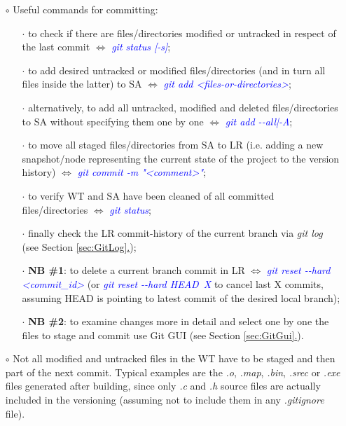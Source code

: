 \documentclass[a4paper,portrait,10pt]{article}   %
\newcommand{\mydiv}{$\Leftrightarrow$ }   %
\newcommand{\mycmd}[1]{\textcolor{blue}{\textit{#1}}}   %
\newcommand{\myvspace}{\vspace{4mm}}   %
\newcommand{\mysecref}[1]{\hyperref[#1]{\ref{#1}.}}   %
\begin{document}
\begin{itemize}
\item[$\circ$] Useful commands for committing:
\begin{itemize}
  \item[$\cdot$] to check if there are files/directories modified or untracked in respect of the last commit \mydiv \mycmd{git status [-s]};
  \item[$\cdot$] to add desired untracked or modified files/directories (and in turn all files inside the latter) to SA \mydiv \mycmd{git add <files-or-directories>};
  \item[$\cdot$] alternatively, to add all untracked, modified and deleted files/directories to SA without specifying them one by one \mydiv \mycmd{git add -{}-all|-A};
  \item[$\cdot$] to move all staged files/directories from SA to LR (i.e. adding a new snapshot/node representing the current state of the project to the version history) \mydiv \mycmd{git commit -m "<comment>"};
  \item[$\cdot$] to verify WT and SA have been cleaned of all committed files/directories \mydiv \mycmd{git status};
  \item[$\cdot$] finally check the LR commit-history of the current branch via \textit{git log} (see Section \mysecref{sec:GitLog});
  \item[$\cdot$] \textbf{NB \#1}: to delete a current branch commit in LR \mydiv \mycmd{git reset -{}-hard <commit\_id>} (or \mycmd{git reset -{}-hard HEAD~X} to cancel last X commits, assuming HEAD is pointing to latest commit of the desired local branch);
  \item[$\cdot$] \textbf{NB \#2}: to examine changes more in detail and select one by one the files to stage and commit use Git GUI (see Section \mysecref{sec:GitGui}).
\end{itemize}
\myvspace

\item[$\circ$] Not all modified and untracked files in the WT have to be staged and then part of the next commit. Typical examples are the \textit{.o}, \textit{.map}, \textit{.bin}, \textit{.srec} or \textit{.exe} files generated after building, since only \textit{.c} and \textit{.h} source files are actually included in the versioning (assuming not to include them in any \textit{.gitignore} file).
\end{itemize}
\myvspace

\end{document}
